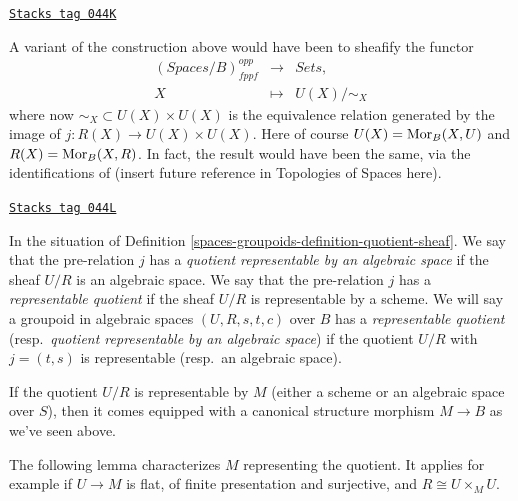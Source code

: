 \begin{remark}
\label{spaces-groupoids-remark-quotient-variant}
\href{https://stacks.math.columbia.edu/tag/044K}{\texttt{Stacks tag 044K}}

A variant of the construction above would have been to sheafify
the functor
$$
\begin{matrix}
(\textit{Spaces}/B)^{opp}_{fppf} &
\longrightarrow &
\textit{Sets}, \\
X &
\longmapsto  &
U(X)/\sim_X
\end{matrix}
$$
where now $\sim_X \subset U(X) \times U(X)$ is the equivalence relation
generated by the image of $j : R(X) \to U(X) \times U(X)$.
Here of course $U(X) = \operatorname{Mor}_B(X, U)$ and $R(X) = \operatorname{Mor}_B(X, R)$.
In fact, the result would have been the same, via the identifications
of (insert future reference in Topologies of Spaces here).
\end{remark}

\begin{definition}
\label{spaces-groupoids-definition-representable-quotient}
\href{https://stacks.math.columbia.edu/tag/044L}{\texttt{Stacks tag 044L}}

In the situation of Definition \ref{spaces-groupoids-definition-quotient-sheaf}.
We say that the pre-relation $j$ has a
{\it quotient representable by an algebraic space}
if the sheaf $U/R$ is an algebraic space.
We say that the pre-relation $j$ has a
{\it representable quotient}
if the sheaf $U/R$ is representable by a scheme.
We will say a groupoid in algebraic spaces $(U, R, s, t, c)$ over $B$ has a
{\it representable quotient}
(resp.\ {\it quotient representable by an algebraic space})
if the quotient $U/R$ with $j = (t, s)$ is representable (resp.\ an
algebraic space).
\end{definition}

If the quotient $U/R$ is representable by $M$ (either a scheme or an algebraic
space over $S$), then it comes equipped with a canonical structure morphism
$M \to B$ as we've seen above.

\medskip\noindent
The following lemma characterizes $M$ representing the quotient.
It applies for example if $U \to M$ is flat,
of finite presentation and surjective, and $R \cong U \times_M U$.

